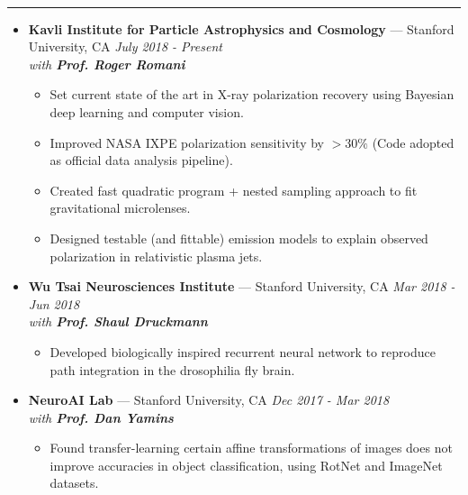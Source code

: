\documentclass[11 pt,oneside]{article}
\newenvironment{ressection}[1]{
	\vspace{4pt}
	{\selectfont\Large\color{Mycolor2}{\textbf{#1}}}
	\vspace{-6.5pt} \\
	\textcolor{Mycolor2}{\rule{\textwidth}{0.7pt}}
	\begin{itemize}
	\vspace{3pt}
}{
	\end{itemize}
}
\newcommand{\ressubitem}{
	\vspace{-4pt}
	\item
}
\newcommand{\resbigitem}[3]{
	\vspace{-5pt}
	\item[]
	\textbf{#1} --- #2 %
	\hfill
	\textit{#3}
}
\newenvironment{ressubsec}[3]{
	\resbigitem{#1}{#2}{#3}
	\vspace{-2pt}
	\begin{itemize}
}{
	\end{itemize}
}
\begin{document}

\vspace{-0pt}

\begin{ressection}{\textbf{Research}}

	\vspace{2pt}
	\begin{ressubsec}{Kavli Institute for Particle Astrophysics and Cosmology}{Stanford University, CA}{July 2018 - Present \\ with \textbf{Prof. Roger Romani}}
	            \ressubitem{Set current state of the art in X-ray polarization recovery using Bayesian deep learning and computer vision.}
	           \ressubitem{Improved NASA IXPE polarization sensitivity by $>30\%$ (Code adopted as official data analysis pipeline).}
	             \ressubitem{Created fast quadratic program + nested sampling approach to fit gravitational microlenses.}
                 \ressubitem{Designed testable (and fittable) emission models to explain observed polarization in relativistic plasma jets.}
	\end{ressubsec}

	\vspace{2pt}
	\begin{ressubsec}{Wu Tsai Neurosciences Institute}{Stanford University, CA}{Mar 2018 - Jun 2018 \\ with \textbf{Prof. Shaul Druckmann}}
                 \ressubitem{Developed biologically inspired recurrent neural network to reproduce path integration in the drosophilia fly brain.} 
	\end{ressubsec}

	\vspace{2pt}
	\begin{ressubsec}{NeuroAI Lab}{Stanford University, CA}{Dec 2017 - Mar 2018 \\ with \textbf{Prof. Dan Yamins}}
                 \ressubitem{Found transfer-learning certain affine transformations of images does not improve accuracies in object classification, using RotNet and ImageNet datasets.}
                 
	\end{ressubsec}
	

\end{ressection}
\end{document}
